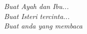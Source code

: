 \begin{dedication}
\emph{Buat Ayah dan Ibu...
\\Buat Isteri tercinta...
\\Buat anda yang membaca}%
\end{dedication}
